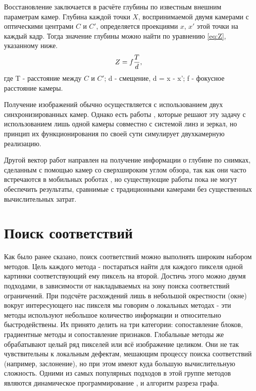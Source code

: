 Восстановление заключается в расчёте глубины по известным внешним параметрам камер. Глубина каждой точки $X$, воспринимаемой двумя камерами 
с оптическими центрами $C$ и $C'$, определяется проекциями $x$, $x'$ этой точки на каждый кадр. Тогда значение глубины можно найти по уравнению \ref{eq:Z}, указанному ниже. 
\begin{equation}	
	Z = f{T \over d},
	\label{eq:Z}
\end{equation}
где T - расстояние между $C$ и $C'$;
    d - смещение,  {d = x - x'};
	f - фокусное расстояние камеры.

Получение изображений обычно осуществляется с использованием двух синхронизированных камер. Однако есть работы \cite{singlecamrev,singlecam}, которые 
решают эту задачу с использованием лишь одной камеры совместно с системой линз и зеркал, но принцип их функционирования по своей сути 
 симулирует двухкамерную реализацию. 
 
 Другой вектор работ направлен на получение информации о глубине по снимках, сделанным с помощью камер со сверхшироким 
 углом обзора, так как они часто встречаются в мобильных роботах \cite{omnifisheye,roxas2019realtime}, но существующие работы пока не могут обеспечить результаты, 
 сравнимые с традиционными камерами без существенных вычислительных затрат. 

\section{Поиск соответствий}
\label{matching}
Как было ранее сказано, поиск соответствий можно выполнять широким набором методов. Цель каждого метода - постараться найти для каждого пикселя одной картинки 
соответствующий ему пиксель на второй. Достичь этого можно двумя подходами, в зависимости от накладываемых на зону поиска соответствий ограничений.  При подсчёте 
расхождений лишь в небольшой окрестности (окне) вокруг интересующего нас пикселя мы говорим о локальных методах - эти методы  используют небольшое количество 
информации и относительно быстродействены. Их принято делить на три категории: сопоставление блоков, градиентные методы и 
сопоставление признаков. 		%
Глобальные методы же обрабатывают целый ряд пикселей или всё изображение целиком. Они не так чувствительны к локальным дефектам, мешающим процессу поиска соответствий 
(например, заслонение), но при этом имеют куда большую вычислительную сложность. Одними из самых популярных подходов в этой группе методов являются динамическое программирование \cite{dynamic_prog},
и алгоритм разреза графа. 

